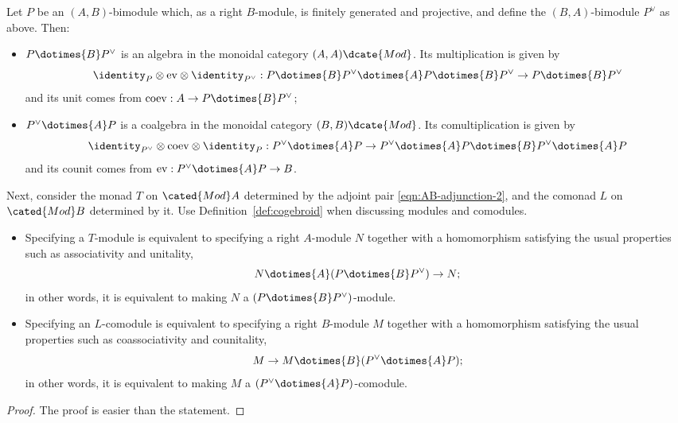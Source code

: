 \begin{proposition}\label{prop:Morita-comonad}
	Let $P$ be an $(A,B)$-bimodule which, as a right $B$-module, is finitely
	generated and projective, and define the $(B,A)$-bimodule $P^\vee$ as
	above. Then:
	\begin{itemize}
		\item $P\dotimes{B}P^\vee$ is an algebra in the monoidal category
		$(A,A)\dcate{Mod}$. Its multiplication is given by
		\[ \identity_P \otimes \mathrm{ev} \otimes \identity_{P^\vee}: P \dotimes{B} P^\vee \dotimes{A} P \dotimes{B} P^\vee \to P \dotimes{B} P^\vee \]
		and its unit comes from
		$\mathrm{coev}:A\to P\dotimes{B}P^\vee$;
		\item $P^\vee\dotimes{A}P$ is a coalgebra in the monoidal category
		$(B,B)\dcate{Mod}$. Its comultiplication is given by
		\[ \identity_{P^\vee} \otimes \mathrm{coev} \otimes \identity_P: P^\vee \dotimes{A} P \to P^\vee \dotimes{A} P \dotimes{B} P^\vee \dotimes{A} P \]
		and its counit comes from
		$\mathrm{ev}:P^\vee\dotimes{A}P\to B$.
	\end{itemize}

	Next, consider the monad $T$ on $\cated{Mod}A$ determined by the adjoint
	pair \eqref{eqn:AB-adjunction-2}, and the comonad $L$ on
	$\cated{Mod}B$ determined by it. Use Definition~\ref{def:cogebroid} when
	discussing modules and comodules.
	\begin{itemize}
		\item Specifying a $T$-module is equivalent to specifying a right
		$A$-module $N$ together with a homomorphism satisfying the usual
		properties such as associativity and unitality,
		\[ N \dotimes{A} (P \dotimes{B} P^\vee) \to N; \]
		in other words, it is equivalent to making $N$ a
		$(P\dotimes{B}P^\vee)$-module.
		\item Specifying an $L$-comodule is equivalent to specifying a right
		$B$-module $M$ together with a homomorphism satisfying the usual
		properties such as coassociativity and counitality,
		\[ M \to M \dotimes{B} (P^\vee \dotimes{A} P); \]
		in other words, it is equivalent to making $M$ a
		$(P^\vee\dotimes{A}P)$-comodule.
	\end{itemize}
\end{proposition}
\begin{proof}
	The proof is easier than the statement.
\end{proof}

